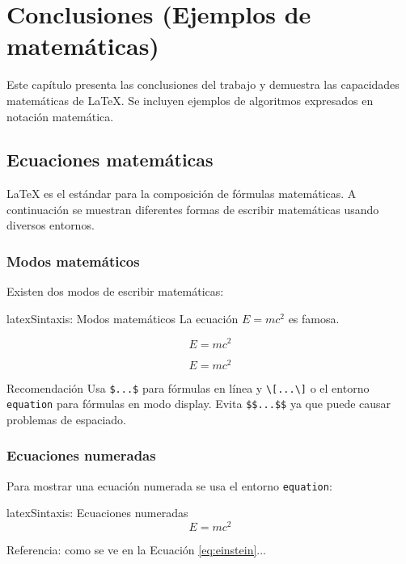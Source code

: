 \chapter{Conclusiones (Ejemplos de matemáticas)}
\label{chap:conclusiones}

Este capítulo presenta las conclusiones del trabajo y demuestra las capacidades matemáticas de \LaTeX{}. Se incluyen ejemplos de \glspl{algoritmo} expresados en notación matemática.

\section{Ecuaciones matemáticas}
\label{sec:ecuaciones-matematicas}

\LaTeX{} es el estándar para la composición de fórmulas matemáticas. A continuación se muestran diferentes formas de escribir matemáticas usando diversos \glspl{entorno}.

\subsection{Modos matemáticos}
\label{subsec:modos-matematicos}

Existen dos modos de escribir matemáticas:

\begin{codigosimple}{latex}{Sintaxis: Modos matemáticos}
La ecuación $E = mc^2$ es famosa.

\[ E = mc^2 \]

$$ E = mc^2 $$
\end{codigosimple}

\begin{infobox}{Recomendación}
Usa \verb|$...$| para fórmulas en línea y \verb|\[...\]| o el entorno \texttt{equation} para fórmulas en modo display. Evita \verb|$$...$$| ya que puede causar problemas de espaciado.
\end{infobox}

\subsection{Ecuaciones numeradas}
\label{subsec:ecuaciones-numeradas}

Para mostrar una ecuación numerada se usa el entorno \texttt{equation}:

\begin{codigosimple}{latex}{Sintaxis: Ecuaciones numeradas}
\begin{equation}
  E = mc^2
  \label{eq:einstein}
\end{equation}

Referencia: como se ve en la Ecuación \ref{eq:einstein}...
\end{codigosimple}

